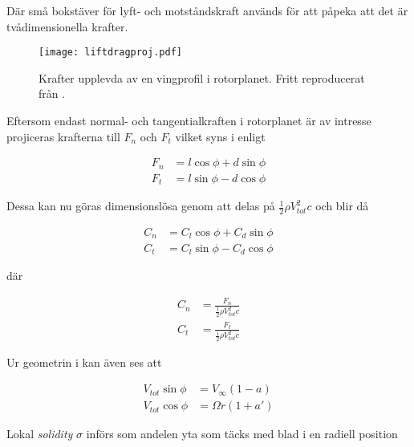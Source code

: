 Där små bokstäver för lyft- och motståndskraft används för att påpeka att det är tvådimensionella krafter.

\begin{figure}[!htb]
  \centering
  \texttt{[image: liftdragproj.pdf]}
  \caption{Krafter upplevda av en vingprofil i rotorplanet. Fritt reproducerat från \citet{hansen}.}
  \label{liftdragproj}
\end{figure}

Eftersom endast normal- och tangentialkraften i rotorplanet är av intresse projiceras krafterna till $F_n$ och $F_t$ vilket syns i  enligt

\begin{equations}
\begin{align}
    F_n &= l \cos \phi + d \sin \phi  \\
    F_t &= l \sin \phi - d \cos \phi
\end{align}
\end{equations}

Dessa kan nu göras dimensionslösa genom att delas på $\frac{1}{2} \rho V_{tot}^2 c$ och blir då

\begin{equations}
\begin{align}
\label{Cn} C_n &= C_l \cos \phi + C_d \sin \phi  \\
\label{Ct} C_t &= C_l \sin \phi - C_d \cos \phi
\end{align}
\end{equations}

där 

\begin{equations}
\begin{align}
\label{Cn2} C_n &= \frac{F_n}{\frac{1}{2}\rho V_{tot}^2 c}\\
\label{Ct2} C_t &= \frac{F_t}{\frac{1}{2}\rho V_{tot}^2 c}
\end{align}
\end{equations}

Ur geometrin i  kan även ses att 

\begin{equations}
\begin{align}
\label{vtotsin} V_{tot} \sin \phi &= V_{\infty} (1 - a) \\
\label{vtotcos}V_{tot} \cos \phi &= \Omega r (1 + a')
\end{align}
\end{equations}

Lokal \emph{solidity} $\sigma$ införs som andelen yta som täcks med blad i en radiell position

